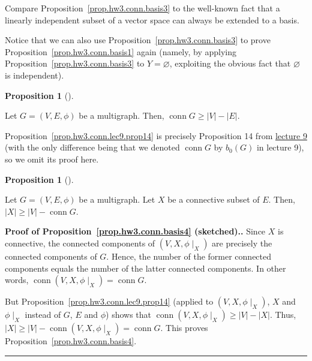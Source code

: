 \documentclass[numbers=enddot,12pt,final,onecolumn,notitlepage]{scrartcl}%
\theoremstyle{definition}
\newtheorem{prop}[theo]{Proposition}
\newenvironment{proposition}[1][]
{\begin{prop}[#1]\begin{leftbar}}
{\end{leftbar}\end{prop}}
\newenvironment{proof}[1][Proof]{\noindent\textbf{#1.} }{\ \rule{0.5em}{0.5em}}
\newcommand{\conn}{\operatorname{conn}}
\newcommand{\abs}[1]{\left| #1 \right|}
\newcommand{\tup}[1]{\left( #1 \right)}
\begin{document}
Compare Proposition~\ref{prop.hw3.conn.basis3} to the well-known
fact that a linearly independent subset of a vector space can always
be extended to a basis.

Notice that we can also use Proposition~\ref{prop.hw3.conn.basis3}
to prove Proposition~\ref{prop.hw3.conn.basis1} again
(namely, by applying Proposition~\ref{prop.hw3.conn.basis3}
to $Y = \varnothing$, exploiting the obvious fact that
$\varnothing$ is independent).

\begin{proposition} \label{prop.hw3.conn.lec9.prop14}
Let $G = \tup{V, E, \phi}$ be a multigraph.
Then, $\conn G \geq \abs{V} - \abs{E}$.
\end{proposition}

Proposition~\ref{prop.hw3.conn.lec9.prop14} is precisely
Proposition 14 from
\href{http://www-users.math.umn.edu/~dgrinber/5707s17/5707lec9.pdf}{lecture 9}
(with the only difference being that we denoted $\conn G$
by $b_0 \tup{G}$ in lecture 9),
so we omit its proof here.

\begin{proposition} \label{prop.hw3.conn.basis4}
Let $G = \tup{V, E, \phi}$ be a multigraph.
Let $X$ be a connective subset of $E$.
Then, $\abs{X} \geq \abs{V} - \conn G$.
\end{proposition}

\begin{proof}[Proof of Proposition~\ref{prop.hw3.conn.basis4}
(sketched).]
Since $X$ is connective, the connected components of
$\tup{V, X, \phi\mid_X}$ are precisely the connected components
of $G$.
Hence, the number of the former connected components equals the
number of the latter connected components.
In other words, $\conn \tup{V, X, \phi\mid_X} = \conn G$.

But Proposition~\ref{prop.hw3.conn.lec9.prop14}
(applied to $\tup{V, X, \phi\mid_X}$, $X$ and $\phi\mid_X$ instead of
$G$, $E$ and $\phi$) shows that
$\conn \tup{V, X, \phi\mid_X} \geq \abs{V} - \abs{X}$.
Thus,
$\abs{X} \geq \abs{V} - \conn \tup{V, X, \phi\mid_X}
= \conn G$.
This proves Proposition~\ref{prop.hw3.conn.basis4}.
\end{proof}
\end{document}
